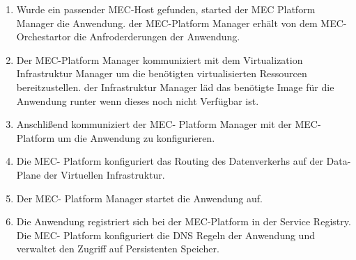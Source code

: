 \documentclass[runningheads]{llncs}
\numberwithin{figure}{section}
\begin{document}
\begin{enumerate}
  \item Wurde ein passender MEC-Host gefunden, started der MEC Platform Manager die Anwendung. der MEC-Platform Manager erhält von dem 
  MEC-Orchestartor die Anfroderderungen der Anwendung.
  \item Der MEC-Platform Manager kommuniziert mit dem Virtualization Infrastruktur Manager um die benötigten virtualisierten Ressourcen 
  bereitzustellen. der Infrastruktur Manager läd das benötigte Image für die Anwendung runter wenn dieses noch nicht Verfügbar ist.
  \item Anschlißend kommuniziert der MEC- Platform Manager mit der MEC- Platform um die Anwendung zu konfigurieren.
  \item Die MEC- Platform konfiguriert das Routing des Datenverkerhs auf der Data-Plane der Virtuellen Infrastruktur.
  \item Der MEC- Platform Manager startet die Anwendung auf.
  \item Die Anwendung registriert sich bei der MEC-Platform in der Service Registry. Die MEC- Platform konfiguriert die DNS Regeln der 
  Anwendung und verwaltet den Zugriff auf Persistenten Speicher.
\end{enumerate}

\newpage
\end{document}
